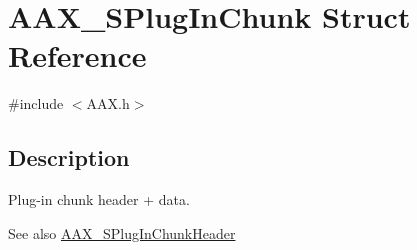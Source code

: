 \hypertarget{a00125}{}\section{A\+A\+X\+\_\+\+S\+Plug\+In\+Chunk Struct Reference}
\label{a00125}


{\ttfamily \#include $<$A\+A\+X.\+h$>$}



\subsection{Description}
Plug-\/in chunk header + data. 

\begin{DoxySeeAlso}{See also}
\hyperlink{a00126}{A\+A\+X\+\_\+\+S\+Plug\+In\+Chunk\+Header} 
\end{DoxySeeAlso}

